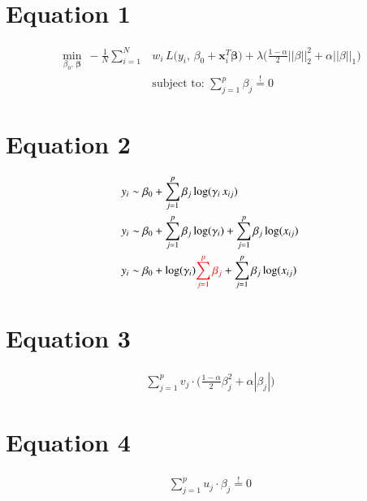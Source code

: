 \documentclass[12pt,a4paper]{article}
\begin{document}
\section{Equation 1}
\begin{align*}	
\underset{\beta_0,\,\boldsymbol{\beta}}{\min}
~-\frac{1}{N}  \sum_{i=1}^N &w_i\, L \big(  y_{i},\,\beta_0
+ \boldsymbol{x}_i^T \boldsymbol{\beta}   \big)
+\lambda   \big(  \frac{1-\alpha}{2}||\beta||^2_2  + \alpha  ||\beta||_1 \big)\\
&\text{subject to: } \sum_{j=1}^p \beta_j \overset{!}{=} 0
\end{align*}
\section{Equation 2}
\begin{align*}
y_i &\sim  \beta_0 + \sum_{j=1}^p \beta_j \log(\gamma_i\, x_{ij})\\
y_i &\sim  \beta_0 + \sum_{j=1}^p \beta_j \log(\gamma_i)+ \sum_{j=1}^p \beta_j \log(x_{ij})\\
y_i &\sim  \beta_0 +\log(\gamma_i) \textcolor{red}{\sum_{j=1}^p \beta_j} + \sum_{j=1}^p \beta_j \log(x_{ij})
\end{align*}


\section{Equation 3}
\begin{align*}	
\sum_{j=1}^p v_j \cdot \Big(  \frac{1-\alpha}{2}\beta_j^2  + \alpha  |\beta_j| \Big)
\end{align*}
\section{Equation 4}
\begin{align*}	
 \sum_{j=1}^p u_j \cdot\beta_j \overset{!}{=} 0
\end{align*}
\end{document}
